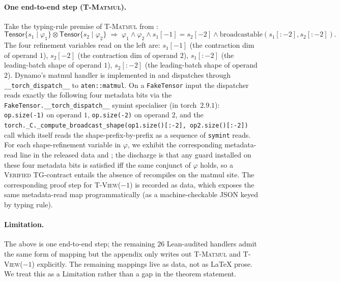 \paragraph{One end-to-end step (\textsc{T-Matmul}).}
Take the typing-rule premise of \textsc{T-Matmul} from
:
\[
 \mathsf{Tensor}\{s_1\mid\varphi_1\}\otimes
 \mathsf{Tensor}\{s_2\mid\varphi_2\}
 \;\Longrightarrow\;
 \varphi_1\wedge\varphi_2\wedge
 s_1[-1]=s_2[-2]\wedge
 \mathrm{broadcastable}(s_1[:-2], s_2[:-2]).
\]
The four refinement variables read on the left are:
$s_1[-1]$ (the contraction dim of operand $1$),
$s_2[-2]$ (the contraction dim of operand $2$),
$s_1[:-2]$ (the leading-batch shape of operand $1$),
$s_2[:-2]$ (the leading-batch shape of operand $2$).
Dynamo's matmul handler is implemented in
 and dispatches
through \texttt{\_\_torch\_dispatch\_\_} to
\texttt{aten::matmul}.
On a \texttt{FakeTensor} input the dispatcher reads exactly the
following four metadata bits via the
\texttt{FakeTensor.\_\_torch\_dispatch\_\_} symint specialiser
(in torch~$2.9.1$): \texttt{op.size(-1)} on operand $1$,
\texttt{op.size(-2)} on operand $2$, and the
\texttt{torch.\_C.\_compute\_broadcast\_shape(op1.size()[:-2],
op2.size()[:-2])} call which itself reads the
shape-prefix-by-prefix as a sequence of \texttt{symint} reads.
For each shape-refinement variable in $\varphi$, we exhibit the
corresponding metadata-read line in the released data and
; the discharge is
that any guard installed on these four metadata bits is
satisfied iff the same conjunct of $\varphi$ holds, so a
\textsc{Verified} \textsc{TG}-contract entails the absence of
recompiles on the matmul site. The corresponding proof step
for \textsc{T-View($-1$)} is recorded as data,
which exposes the same metadata-read map programmatically (as a
machine-checkable JSON keyed by typing rule).

\paragraph{Limitation.} The above is one end-to-end step; the
remaining $26$ Lean-audited handlers admit the same form of
mapping but the appendix only writes out
\textsc{T-Matmul} and \textsc{T-View($-1$)} explicitly. The
remaining mappings live as data, not as
\LaTeX{} prose. We treat this as a Limitation rather than a
gap in the theorem statement.





